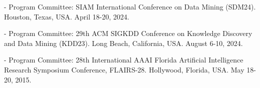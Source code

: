 \begin{innerlist}
  \item[-] Program Committee: SIAM International Conference on Data Mining (SDM24).
  Houston, Texas, USA.
  April 18-20, 2024.

  \item[-] Program Committee: 29th ACM SIGKDD Conference on Knowledge Discovery and Data Mining (KDD23).
  Long Beach, California, USA.
  August 6-10, 2024.

  \item[-] Program Committee: 28th International AAAI Florida Artificial Intelligence Research Symposium Conference,
  FLAIRS-28.
  Hollywood, Florida, USA.
  May 18-20, 2015.
\end{innerlist}
